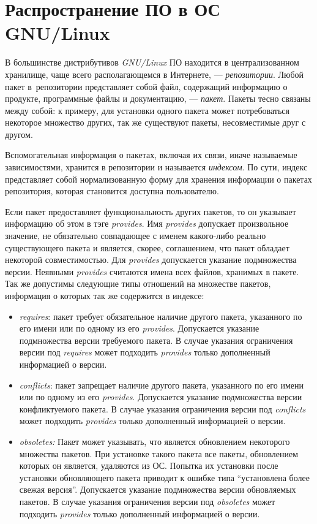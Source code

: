 \section{Распространение ПО в ОС GNU/Linux}

В большинстве дистрибутивов \textit{GNU/Linux} ПО находится
в централизованном хранилище, чаще всего располагающемся в Интернете, 
--- \textit{репозитории}. Любой пакет в~репозитории представляет собой файл, содержащий
информацию о продукте, программные файлы и документацию, --- \textit{пакет}. 
Пакеты тесно связаны между собой: к примеру, для установки одного пакета
может потребоваться некоторое множество других, так же существуют пакеты, 
несовместимые друг с другом. 

Вспомогательная информация о пакетах, включая их связи, иначе называемые зависимостями,
хранится в репозитории и называется \textit{индексом}.
По сути, индекс представляет собой нормализованную форму для хранения информации о пакетах 
репозитория, которая становится доступна пользователю.

Если пакет предоставляет 
функциональность других пакетов, то он указывает информацию об этом в тэге \textit{provides}.
Имя \textit{provides} допускает произвольное значение, не обязательно совпадающее с
именем какого-либо реально существующего  пакета и является, скорее, соглашением, что пакет
обладает некоторой совместимостью. Для \textit{provides} допускается указание подмножества 
версии. Неявными \textit{provides} считаются имена всех файлов, хранимых в пакете.\\

Так же допустимы следующие типы отношений на множестве пакетов, информация о которых так
же содержится в индексе\cite{deepsolver_ta}:
\begin{itemize}
\item{\textit{requires}: пакет требует обязательное наличие другого пакета, указанного
по его имени или по одному из его \textit{provides}. Допускается указание 
подмножества версии требуемого пакета. В случае указания ограничения версии
под \textit{requires} может подходить \textit{provides} только дополненный информацией
о версии.}
\item{\textit{conflicts}: пакет запрещает наличие другого пакета, указанного по его имени
 или по одному из его \textit{provides}. Допускается указание подмножества
версии конфликтуемого пакета. В случае указания ограничения версии
под \textit{conflicts} может подходить \textit{provides} только дополненный информацией
о версии.}
\item{\textit{obsoletes:} Пакет может указывать, что является обновлением некоторого
множества пакетов. При установке такого пакета все пакеты, обновлением
которых он является, удаляются из ОС. Попытка их установки после
установки обновляющего пакета приводит к ошибке типа ``установлена
более свежая версия''. Допускается указание подмножества версии обновляемых
пакетов. В случае указания ограничения версии под \textit{obsoletes} может
подходить \textit{provides} только дополненный информацией о версии.}
\end{itemize}

